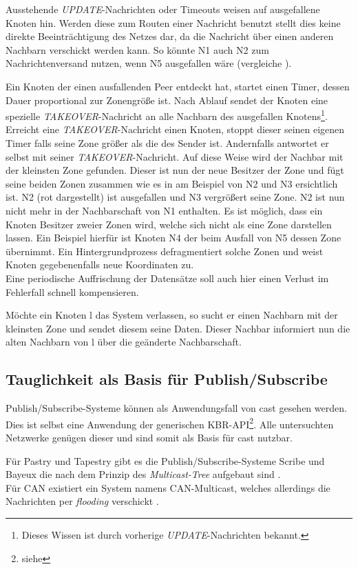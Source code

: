 Ausstehende \emph{UPDATE}-Nachrichten oder Timeouts weisen auf ausgefallene Knoten hin. Werden diese zum Routen einer Nachricht benutzt stellt dies keine direkte Beeinträchtigung des Netzes dar, da die Nachricht über einen anderen Nachbarn verschickt werden kann. So könnte N1 auch N2 zum Nachrichtenversand nutzen, wenn N5 ausgefallen wäre (vergleiche ).

Ein Knoten der einen ausfallenden Peer entdeckt hat, startet einen Timer, dessen Dauer proportional zur Zonengröße ist. Nach Ablauf sendet der Knoten eine spezielle \emph{TAKEOVER}-Nachricht an alle Nachbarn des ausgefallen Knotens\footnote{Dieses Wissen ist durch vorherige \emph{UPDATE}-Nachrichten bekannt.}. Erreicht eine \emph{TAKEOVER}-Nachricht einen Knoten, stoppt dieser seinen eigenen Timer falls seine Zone größer als die des Sender ist. Andernfalls antwortet er selbst mit seiner \emph{TAKEOVER}-Nachricht. Auf diese Weise wird der Nachbar mit der kleinsten Zone gefunden. Dieser ist nun der neue Besitzer der Zone und fügt seine beiden Zonen zusammen wie es in  am Beispiel von N2 und N3 ersichtlich ist. N2 (rot dargestellt) ist ausgefallen und N3 vergrößert seine Zone. N2 ist nun nicht mehr in der Nachbarschaft von N1 enthalten. Es ist möglich, dass ein Knoten Besitzer zweier Zonen wird, welche sich nicht als eine Zone darstellen lassen. Ein Beispiel hierfür ist Knoten N4 der beim Ausfall von N5 dessen Zone übernimmt. Ein Hintergrundprozess defragmentiert solche Zonen und weist Knoten gegebenenfalls neue Koordinaten zu.\\
Eine periodische Auffrischung der Datensätze soll auch hier einen Verlust im Fehlerfall schnell kompensieren.

Möchte ein Knoten l das System verlassen, so sucht er einen Nachbarn mit der kleinsten Zone und sendet diesem seine Daten. Dieser Nachbar informiert nun die alten Nachbarn von l über die geänderte Nachbarschaft.

\subsection*{Tauglichkeit als Basis für Publish/Subscribe}
Publish/Subscribe-Systeme können als Anwendungsfall von \ac{cast} gesehen werden. Dies ist selbst eine Anwendung der generischen KBR-API\footnote{siehe }. Alle untersuchten Netzwerke genügen dieser und sind somit als Basis für \ac{cast} nutzbar.

Für Pastry und Tapestry gibt es die Publish/Subscribe-Systeme Scribe und Bayeux die nach dem Prinzip des \emph{Multicast-Tree} aufgebaut sind \cite{Castro2002Scribe, Zhuang2001}.\\
Für CAN existiert ein System namens CAN-Multicast, welches allerdings die Nachrichten per \emph{flooding} verschickt \cite{Ratnasamy2001}.

